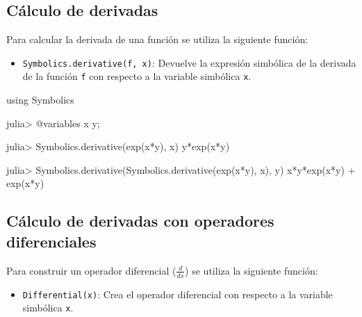 \documentclass[
  letterpaper,
  DIV=11,
  numbers=noendperiod]{scrreprt}
\newenvironment{Shaded}{\begin{snugshade}}{\end{snugshade}}
\newcommand{\BuiltInTok}[1]{\textcolor[rgb]{0.00,0.23,0.31}{#1}}
\newcommand{\FunctionTok}[1]{\textcolor[rgb]{0.28,0.35,0.67}{#1}}
\newcommand{\ImportTok}[1]{\textcolor[rgb]{0.00,0.46,0.62}{#1}}
\newcommand{\NormalTok}[1]{\textcolor[rgb]{0.00,0.23,0.31}{#1}}
\newcommand{\OperatorTok}[1]{\textcolor[rgb]{0.37,0.37,0.37}{#1}}
\newcommand{\PreprocessorTok}[1]{\textcolor[rgb]{0.68,0.00,0.00}{#1}}
\providecommand{\tightlist}{%
  \setlength{\itemsep}{0pt}\setlength{\parskip}{0pt}}\usepackage{longtable,booktabs,array}
\begin{document}
\hypertarget{cuxe1lculo-de-derivadas}{%
\subsection{Cálculo de derivadas}\label{cuxe1lculo-de-derivadas}}

Para calcular la derivada de una función se utiliza la siguiente
función:

\begin{itemize}
\tightlist
\item
  \texttt{Symbolics.derivative(f,\ x)}: Devuelve la expresión simbólica
  de la derivada de la función \texttt{f} con respecto a la variable
  simbólica \texttt{x}.
\end{itemize}

\begin{Shaded}
\begin{Highlighting}[]
\ImportTok{using} \BuiltInTok{Symbolics}

\NormalTok{julia}\OperatorTok{\textgreater{}} \PreprocessorTok{@variables}\NormalTok{ x y;}

\NormalTok{julia}\OperatorTok{\textgreater{}}\NormalTok{ Symbolics.}\FunctionTok{derivative}\NormalTok{(}\FunctionTok{exp}\NormalTok{(x}\OperatorTok{*}\NormalTok{y), x)}
\FunctionTok{y*exp}\NormalTok{(x}\OperatorTok{*}\NormalTok{y)}

\NormalTok{julia}\OperatorTok{\textgreater{}}\NormalTok{ Symbolics.}\FunctionTok{derivative}\NormalTok{(Symbolics.}\FunctionTok{derivative}\NormalTok{(}\FunctionTok{exp}\NormalTok{(x}\OperatorTok{*}\NormalTok{y), x), y)}
\FunctionTok{x*y*exp}\NormalTok{(x}\OperatorTok{*}\NormalTok{y) }\OperatorTok{+} \FunctionTok{exp}\NormalTok{(x}\OperatorTok{*}\NormalTok{y)}
\end{Highlighting}
\end{Shaded}

\hypertarget{cuxe1lculo-de-derivadas-con-operadores-diferenciales}{%
\subsection{Cálculo de derivadas con operadores
diferenciales}\label{cuxe1lculo-de-derivadas-con-operadores-diferenciales}}

Para construir un operador diferencial (\(\frac{d}{dx}\)) se utiliza la
siguiente función:

\begin{itemize}
\tightlist
\item
  \texttt{Differential(x)}: Crea el operador diferencial con respecto a
  la variable simbólica \texttt{x}.
\end{itemize}
\end{document}
